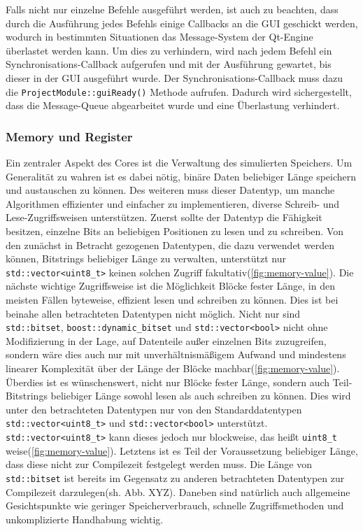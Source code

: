 Falls nicht nur einzelne Befehle ausgeführt werden, ist auch zu beachten, dass
durch die Ausführung jedes Befehls einige Callbacks an die GUI geschickt werden,
wodurch in bestimmten Situationen das Message-System der Qt-Engine überlastet
werden kann. Um dies zu verhindern, wird nach jedem Befehl ein
Synchronisations-Callback aufgerufen und mit der Ausführung gewartet, bis dieser
in der GUI ausgeführt wurde. Der Synchronisations-Callback muss dazu die
\texttt{ProjectModule::guiReady()} Methode aufrufen. Dadurch wird
sichergestellt, dass die Message-Queue abgearbeitet wurde und eine Überlastung
verhindert.

\subsubsection{Memory und Register}

Ein zentraler Aspekt des Cores ist die Verwaltung des simulierten Speichers. Um
Generalität zu wahren ist es dabei nötig, binäre Daten beliebiger Länge
speichern und austauschen zu können. Des weiteren muss dieser Datentyp, um
manche Algorithmen effizienter und einfacher zu implementieren, diverse Schreib-
und Lese-Zugriffsweisen unterstützen. Zuerst sollte der Datentyp die Fähigkeit
besitzen, einzelne Bits an beliebigen Positionen zu lesen und zu schreiben. Von
den zunächst in Betracht gezogenen Datentypen, die dazu verwendet werden können,
Bitstrings beliebiger Länge zu verwalten, unterstützt nur
\texttt{std::vector<uint8\_t>} keinen solchen Zugriff
fakultativ(\autoref{fig:memory-value}). Die nächste wichtige Zugriffsweise ist
die Möglichkeit Blöcke fester Länge, in den meisten Fällen byteweise, effizient
lesen und schreiben zu können. Dies ist bei beinahe allen betrachteten Datentypen
nicht möglich. Nicht nur sind \texttt{std::bitset},
\texttt{boost::dynamic\_bitset} und \texttt{std::vector<bool>} nicht ohne
Modifizierung in der Lage, auf Datenteile außer einzelnen Bits zuzugreifen,
sondern wäre dies auch nur mit unverhältnismäßigem Aufwand und mindestens
linearer Komplexität über der Länge der Blöcke
machbar(\autoref{fig:memory-value}). Überdies ist es wünschenswert, nicht nur
Blöcke fester Länge, sondern auch Teil-Bitstrings beliebiger Länge sowohl lesen
als auch schreiben zu können. Dies wird unter den betrachteten Datentypen nur
von den Standarddatentypen \texttt{std::vector<uint8\_t>} und
\texttt{std::vector<bool>} unterstützt. \texttt{std::vector<uint8\_t>} kann
dieses jedoch nur blockweise, das heißt \texttt{uint8\_t }
weise(\autoref{fig:memory-value}). Letztens ist es Teil der Voraussetzung
beliebiger Länge, dass diese nicht zur Compilezeit festgelegt werden muss. Die
Länge von \texttt{std::bitset} ist bereits im Gegensatz zu anderen
betrachteten Datentypen zur Compilezeit darzulegen(sh. Abb. XYZ). Daneben sind
natürlich auch allgemeine Gesichtspunkte wie geringer Speicherverbrauch,
schnelle Zugriffsmethoden und unkomplizierte Handhabung wichtig.

